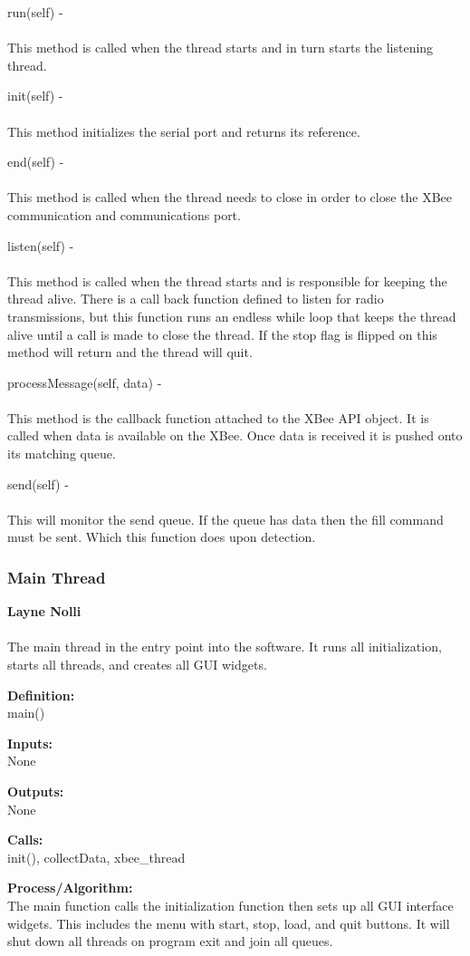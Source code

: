 \documentclass[10pt,draftclsnofoot,onecolumn,compsoc]{IEEEtran}
\begin{document}
run(self) - \\ \\
This method is called when the thread starts and in turn starts the listening thread. \par

init(self) - \\ \\
This method initializes the serial port and returns its reference. \par

end(self) - \\ \\
This method is called when the thread needs to close in order to close the XBee communication and communications port. \par

listen(self) - \\ \\
This method is called when the thread starts and is responsible for keeping the thread alive. There is a call back function defined to listen for radio transmissions, but this function runs an endless while loop that keeps the thread alive until a call is made to close the thread. If the stop flag is flipped on this method will return and the thread will quit.	 \par

processMessage(self, data) - \\ \\
This method is the callback function attached to the XBee API object. It is called when data is available on the XBee. Once data is received it is pushed onto its matching queue.

send(self) - \\ \\
This will monitor the send queue. If the queue has data then the fill command must be sent. Which this function does upon detection. \par

\subsubsection{Main Thread}
{\bf Layne Nolli } 
\\ \\
The main thread in the entry point into the software. It runs all initialization, starts all threads, and creates all GUI widgets. \par
{\bf Definition:} \\ 
main() \par
{\bf Inputs:} \\  None \par
{\bf Outputs:} \\ None \par
{\bf Calls:} \\ init(), collectData, xbee\_thread \par
{\bf Process/Algorithm:} \\
The main function calls the initialization function then sets up all GUI interface widgets. This includes the menu with start, stop, load, and quit buttons. It will shut down all threads on program exit and join all queues. \par
\end{document}
